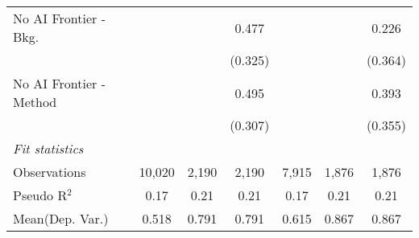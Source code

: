 \begin{tabular}{lcccccc}
   No AI Frontier - Bkg.   &         &         & 0.477   &         &         & 0.226\\   
                           &         &         & (0.325) &         &         & (0.364)\\   
   No AI Frontier - Method &         &         & 0.495   &         &         & 0.393\\   
                           &         &         & (0.307) &         &         & (0.355)\\   
   \midrule
   \emph{Fit statistics}\\
   Observations            & 10,020  & 2,190   & 2,190   & 7,915   & 1,876   & 1,876\\  
   Pseudo R$^2$            & 0.17    & 0.21    & 0.21    & 0.17    & 0.21    & 0.21\\  
Mean(Dep. Var.) & 0.518 & 0.791 & 0.791 & 0.615 & 0.867 & 0.867 \\
   

\end{tabular}
